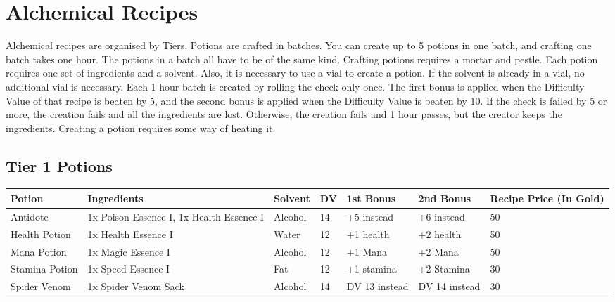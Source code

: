 \section{Alchemical Recipes}\label{sec:alchemicalRecipes}
Alchemical recipes are organised by Tiers.
Potions are crafted in batches.
You can create up to 5 potions in one batch, and crafting one batch takes one hour.
The potions in a batch all have to be of the same kind.
Crafting potions requires a mortar and pestle.
Each potion requires one set of ingredients and a solvent.
Also, it is necessary to use a vial to create a potion.
If the solvent is already in a vial, no additional vial is necessary.
Each 1-hour batch is created by rolling the check only once. 
The first bonus is applied when the Difficulty Value of that recipe is beaten by 5, and the second bonus is applied when the Difficulty Value is beaten by 10. 
If the check is failed by 5 or more, the creation fails and all the ingredients are lost.
Otherwise, the creation fails and 1 hour passes, but the creator keeps the ingredients.
Creating a potion requires some way of heating it.\\


\subsection{Tier 1 Potions}
\begin{longtable}{l | p{2.5cm} | l | l | p{1.5cm} | p{1.5cm} | p{1cm} }
	Potion & Ingredients & Solvent & DV & 1st Bonus & 2nd Bonus & Recipe Price (In Gold)\\ \hline
	Antidote & 1x Poison Essence I, 1x Health Essence I & Alcohol & 14 & +5 instead & +6 instead & 50\\
	Health Potion & 1x Health Essence I & Water & 12 & +1 health & +2 health & 50\\
	Mana Potion & 1x Magic Essence I & Alcohol & 12 & +1 Mana & +2 Mana & 50\\
	Stamina Potion & 1x Speed Essence I & Fat & 12 & +1 stamina & +2 Stamina & 30\\
	Spider Venom & 1x Spider Venom Sack & Alcohol & 14 & DV 13 instead & DV 14 instead & 30\\
\end{longtable}